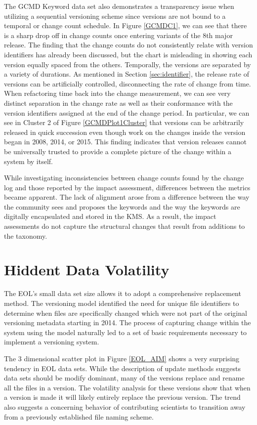 The GCMD Keyword data set also demonstrates a transparency issue when utilizing a sequential versioning scheme since versions are not bound to a temporal or change count schedule.  
In Figure \ref{GCMDC1}, we can see that there is a sharp drop off in change counts once entering variants of the 8th major release.  
The finding that the change counts do not consistently relate with version identifiers has already been discussed, but the chart is misleading in showing each version equally spaced from the others.  
Temporally, the versions are separated by a variety of durations.  As mentioned in Section \ref{sec:identifier}, the release rate of versions can be artificially controlled, disconnecting the rate of change from time.  
When refactoring time back into the change measurement, we can see very distinct separation in the change rate as well as their conformance with the version identifiers assigned at the end of the change period.  
In particular, we can see in Cluster 2 of Figure \ref{GCMDPlot1Cluster} that versions can be arbitrarily released in quick succession even though work on the changes inside the version began in 2008, 2014, or 2015.  
This finding indicates that version releases cannot be universally trusted to provide a complete picture of the change within a system by itself.

While investigating inconsistencies between change counts found by the change log and those reported by the impact assessment, differences between the metrics became apparent.  
The lack of alignment arose from a difference between the way the community sees and proposes the keywords and the way the keywords are digitally encapsulated and stored in the KMS.  
As a result, the impact assessments do not capture the structural changes that result from additions to the taxonomy.

\section{Hiddent Data Volatility}

The EOL’s small data set size allows it to adopt a comprehensive replacement method.  
The versioning model identified the need for unique file identifiers to determine when files are specifically changed which were not part of the original versioning metadata starting in 2014.  
The process of capturing change within the system using the model naturally led to a set of basic requirements necessary to implement a versioning system.

The 3 dimensional scatter plot in Figure \ref{EOL_AIM} shows a very surprising tendency in EOL data sets.  
While the description of update methods suggests data sets should be modify dominant, many of the versions replace and rename all the files in a version.  
The volatility analysis for these versions show that when a version is made it will likely entirely replace the previous version.  
The trend also suggests a concerning behavior of contributing scientists to transition away from a previously established file naming scheme.

